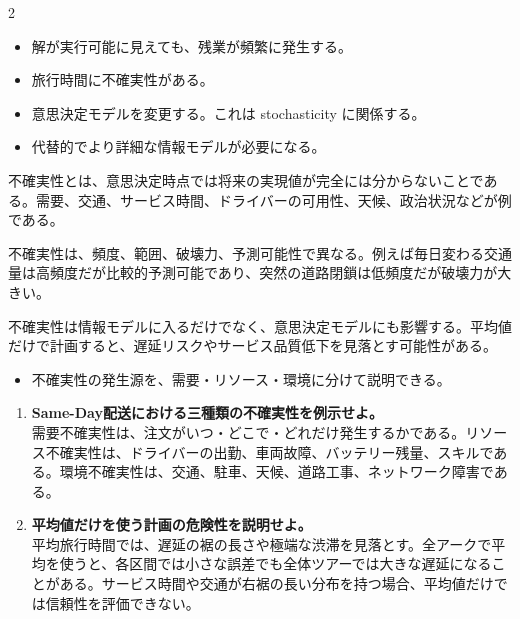 \clearpage
{}
\begin{multicols}{2}\footnotesize\raggedcolumns
{}
\begin{itemize}
\item 解が実行可能に見えても、残業が頻繁に発生する。
\item 旅行時間に不確実性がある。
\item 意思決定モデルを変更する。これは stochasticity に関係する。
\item 代替的でより詳細な情報モデルが必要になる。
\end{itemize}
不確実性とは、意思決定時点では将来の実現値が完全には分からないことである。需要、交通、サービス時間、ドライバーの可用性、天候、政治状況などが例である。\par

不確実性は、頻度、範囲、破壊力、予測可能性で異なる。例えば毎日変わる交通量は高頻度だが比較的予測可能であり、突然の道路閉鎖は低頻度だが破壊力が大きい。\par

不確実性は情報モデルに入るだけでなく、意思決定モデルにも影響する。平均値だけで計画すると、遅延リスクやサービス品質低下を見落とす可能性がある。\par
{}
\begin{itemize}
\item 不確実性の発生源を、需要・リソース・環境に分けて説明できる。
\end{itemize}
\begin{enumerate}
\item \textbf{Same-Day配送における三種類の不確実性を例示せよ。}\\需要不確実性は、注文がいつ・どこで・どれだけ発生するかである。リソース不確実性は、ドライバーの出勤、車両故障、バッテリー残量、スキルである。環境不確実性は、交通、駐車、天候、道路工事、ネットワーク障害である。
\item \textbf{平均値だけを使う計画の危険性を説明せよ。}\\平均旅行時間では、遅延の裾の長さや極端な渋滞を見落とす。全アークで平均を使うと、各区間では小さな誤差でも全体ツアーでは大きな遅延になることがある。サービス時間や交通が右裾の長い分布を持つ場合、平均値だけでは信頼性を評価できない。
\end{enumerate}
\end{multicols}

